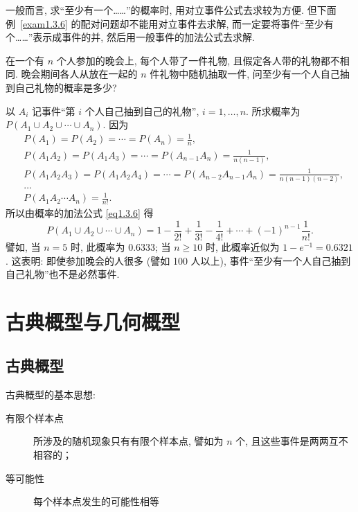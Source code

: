 一般而言,
求“至少有一个……”的概率时,
用对立事件公式去求较为方便.
但下面例~\ref{exam1.3.6} 的配对问题却不能用对立事件去求解,
而一定要将事件“至少有个……”表示成事件的并,
然后用一般事件的加法公式去求解.

\begin{example}[配对问题]\label{exam1.3.6}
    在一个有 $n$ 个人参加的晚会上,
    每个人带了一件礼物,
    且假定各人带的礼物都不相同.
    晚会期间各人从放在一起的 $n$ 件礼物中随机抽取一件,
    问至少有一个人自己抽到自己礼物的概率是多少?
\end{example}

\begin{solution}
    以 $A_i$ 记事件“第 $i$ 个人自己抽到自己的礼物”,
    $i=1,\dotsc,n$.
    所求概率为 $P(A_1 \cup A_2 \cup \dotsb \cup A_n)$.
    因为
    \begin{align*}
         & P(A_1) = P(A_2) = \dotsb = P(A_n) =\frac{1}{n},                                              \\
         & P(A_1 A_2) = P(A_1 A_3) = \dotsb = P(A_{n-1} A_n) = \frac{1}{n (n-1)},                       \\
         & P(A_1 A_2 A_3) = P(A_1 A_2 A_4) = \dotsb = P(A_{n-2} A_{n-1} A_n) = \frac{1}{n (n-1) (n-2)}, \\
         & \ldots                                                                                       \\
         & P(A_1 A_2 \dotsb A_n) = \frac{1}{n!}.
    \end{align*}
    所以由概率的加法公式 \eqref{eq1.3.6} 得
    \[
        P(A_1 \cup A_2 \cup \dotsb \cup A_n) = 1 - \frac{1}{2!} + \frac{1}{3!} - \frac{1}{4!} + \dotsb + (-1)^{n-1} \frac{1}{n!}.
    \]
    譬如,
    当 $n=5$ 时,
    此概率为 \num{0.6333};
    当 $n \ge 10$ 时,
    此概率近似为 $1 - e^{-1} = 0.6321$.
    这表明:
    即使参加晚会的人很多 (譬如 100 人以上),
    事件“至少有一个人自己抽到自己礼物”也不是必然事件.
\end{solution}

\section{古典概型与几何概型}

\subsection{古典概型}

古典概型的基本思想:
\begin{description}
    \item[有限个样本点] 所涉及的随机现象只有有限个样本点, 譬如为 $n$ 个, 且这些事件是两两互不相容的；
    \item[等可能性] 每个样本点发生的可能性相等
\end{description}

